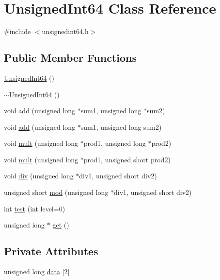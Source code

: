 \hypertarget{classUnsignedInt64}{\section{Unsigned\-Int64 Class Reference}
\label{classUnsignedInt64}
}


{\ttfamily \#include $<$unsignedint64.\-h$>$}

\subsection*{Public Member Functions}
\begin{DoxyCompactItemize}
\item 
\hyperlink{classUnsignedInt64_ad45cee6b995cad3062c906c5ed2705d9}{Unsigned\-Int64} ()
\item 
\hyperlink{classUnsignedInt64_a2767927a925ab2e7186c863f16043a9d}{$\sim$\-Unsigned\-Int64} ()
\item 
void \hyperlink{classUnsignedInt64_af813efd90a8e9e1fc89d9274dfc874db}{add} (unsigned long $\ast$sum1, unsigned long $\ast$sum2)
\item 
void \hyperlink{classUnsignedInt64_a08a0cdd031c49ca9165e77dd92ff5cf5}{add} (unsigned long $\ast$sum1, unsigned long sum2)
\item 
void \hyperlink{classUnsignedInt64_af8da78cf70fa21dc3003c4779259d006}{mult} (unsigned long $\ast$prod1, unsigned long $\ast$prod2)
\item 
void \hyperlink{classUnsignedInt64_a9f20d16d3d75f6e646be3809638a088d}{mult} (unsigned long $\ast$prod1, unsigned short prod2)
\item 
void \hyperlink{classUnsignedInt64_aa1a72d942a20576932f1a1329b0d9df6}{div} (unsigned long $\ast$div1, unsigned short div2)
\item 
unsigned short \hyperlink{classUnsignedInt64_a17ba5f97b8bd42a4555dbaf53a6bd269}{mod} (unsigned long $\ast$div1, unsigned short div2)
\item 
int \hyperlink{classUnsignedInt64_a61d831da583bf56ac44c32f02dc5afee}{test} (int level=0)
\item 
unsigned long $\ast$ \hyperlink{classUnsignedInt64_a577122e70df0f33191add0d9305771cb}{get} ()
\end{DoxyCompactItemize}
\subsection*{Private Attributes}
\begin{DoxyCompactItemize}
\item 
unsigned long \hyperlink{classUnsignedInt64_a34f0d86cf4dd2f0523e1c844d169eaa9}{data} \mbox{[}2\mbox{]}
\end{DoxyCompactItemize}


